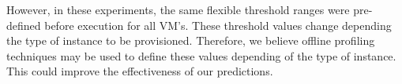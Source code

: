 However, in these experiments, the same flexible threshold ranges were pre-defined before execution for all VM's. These threshold values change depending the type of instance to be provisioned. Therefore, we believe offline profiling techniques may be used to define these values depending of the type of instance. This could improve the effectiveness of our predictions.




